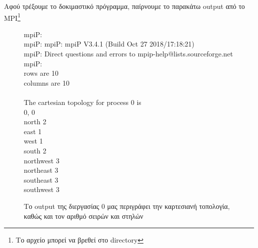 \clearpage
Αφού τρέξουμε το δοκιμαστικό πρόγραμμα, παίρνουμε το παρακάτω output από το MPI\footnote{Το αρχείο μπορεί να βρεθεί στο directory }

\begin{figure}[h]
\begin{tcolorbox}
mpiP: \\
mpiP: mpiP: mpiP V3.4.1 (Build Oct 27 2018/17:18:21) \\
mpiP: Direct questions and errors to mpip-help@lists.sourceforge.net \\
mpiP:  \\
rows are 10 \\
columns are 10 \\
\\
The cartesian topology for process 0 is \\
0, 0 \\
north 2 \\
east 1 \\
west 1 \\
south 2 \\
northwest 3 \\
northeast 3 \\
southeast 3 \\
southwest 3 \\
\end{tcolorbox}
\caption{Το output της διεργασίας $0$ μας περιγράφει την καρτεσιανή τοπολογία, καθώς και τον αριθμό σειρών και στηλών}
\label{fig:verification}
\end{figure}

